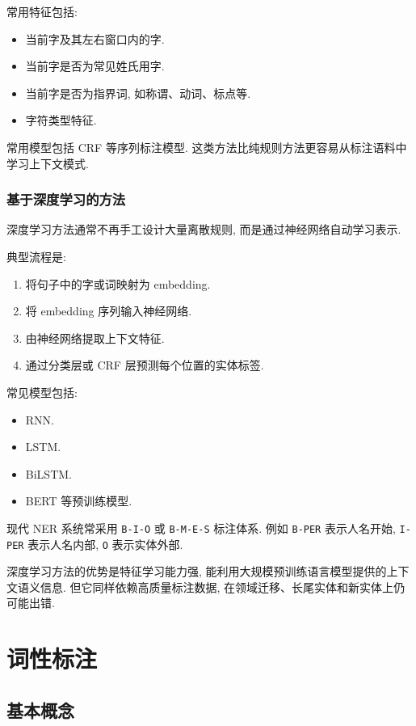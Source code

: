常用特征包括:

\begin{itemize}
\item 当前字及其左右窗口内的字.
\item 当前字是否为常见姓氏用字.
\item 当前字是否为指界词, 如称谓、动词、标点等.
\item 字符类型特征.
\end{itemize}

常用模型包括 CRF 等序列标注模型.
这类方法比纯规则方法更容易从标注语料中学习上下文模式.

\subsubsection{基于深度学习的方法}


深度学习方法通常不再手工设计大量离散规则, 而是通过神经网络自动学习表示.

典型流程是:

\begin{enumerate}
\item[1.] 将句子中的字或词映射为 embedding.
\item[2.] 将 embedding 序列输入神经网络.
\item[3.] 由神经网络提取上下文特征.
\item[4.] 通过分类层或 CRF 层预测每个位置的实体标签.
\end{enumerate}

常见模型包括:

\begin{itemize}
\item RNN.
\item LSTM.
\item BiLSTM.
\item BERT 等预训练模型.
\end{itemize}

现代 NER 系统常采用 \texttt{B-I-O} 或 \texttt{B-M-E-S} 标注体系.
例如 \texttt{B-PER} 表示人名开始, \texttt{I-PER} 表示人名内部, \texttt{O} 表示实体外部.

深度学习方法的优势是特征学习能力强, 能利用大规模预训练语言模型提供的上下文语义信息.
但它同样依赖高质量标注数据, 在领域迁移、长尾实体和新实体上仍可能出错.

\section{词性标注}


\subsection{基本概念}


